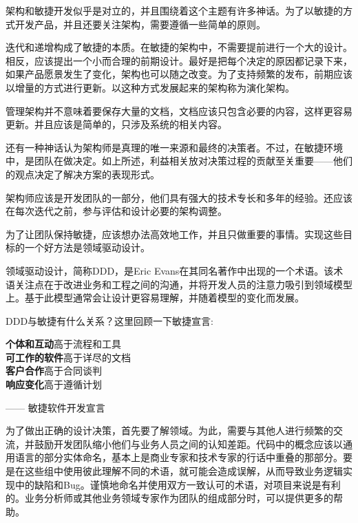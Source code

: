 
架构和敏捷开发似乎是对立的，并且围绕着这个主题有许多神话。为了以敏捷的方式开发产品，并且还要关注架构，需要遵循一些简单的原则。

迭代和递增构成了敏捷的本质。在敏捷的架构中，不需要提前进行一个大的设计。相反，应该提出一个小而合理的前期设计。最好是把每个决定的原因都记录下来，如果产品愿景发生了变化，架构也可以随之改变。为了支持频繁的发布，前期应该以增量的方式进行更新。以这种方式发展起来的架构称为演化架构。

管理架构并不意味着要保存大量的文档，文档应该只包含必要的内容，这样更容易更新。并且应该是简单的，只涉及系统的相关内容。

还有一种神话认为架构师是真理的唯一来源和最终的决策者。不过，在敏捷环境中，是团队在做决定。如上所述，利益相关放对决策过程的贡献至关重要——他们的观点决定了解决方案的表现形式。

架构师应该是开发团队的一部分，他们具有强大的技术专长和多年的经验。还应该在每次迭代之前，参与评估和设计必要的架构调整。

为了让团队保持敏捷，应该想办法高效地工作，并且只做重要的事情。实现这些目标的一个好方法是领域驱动设计。



领域驱动设计，简称DDD，是Eric Evans在其同名著作中出现的一个术语。该术语关注点在于改进业务和工程之间的沟通，并将开发人员的注意力吸引到领域模型上。基于此模型通常会让设计更容易理解，并随着模型的变化而发展。

DDD与敏捷有什么关系？这里回顾一下敏捷宣言:

\begin{flushleft}
\noindent
\hspace*{0.8cm}\textbf{个体和互动}高于流程和工具 \\
\hspace*{0.8cm}\textbf{可工作的软件}高于详尽的文档 \\
\hspace*{0.8cm}\textbf{客户合作}高于合同谈判 \\
\hspace*{0.8cm}\textbf{响应变化}高于遵循计划

\noindent
\hspace*{0.8cm} —— 敏捷软件开发宣言
\end{flushleft}


为了做出正确的设计决策，首先要了解领域。为此，需要与其他人进行频繁的交流，并鼓励开发团队缩小他们与业务人员之间的认知差距。代码中的概念应该以通用语言的部分实体命名，基本上是商业专家和技术专家的行话中重叠的那部分。要是在这些组中使用彼此理解不同的术语，就可能会造成误解，从而导致业务逻辑实现中的缺陷和Bug。谨慎地命名并使用双方一致认可的术语，对项目来说是有利的。业务分析师或其他业务领域专家作为团队的组成部分时，可以提供更多的帮助。

